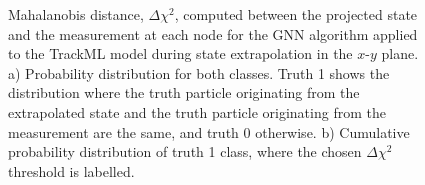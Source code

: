 \begin{figure}[htbp!] 
    \centering
    \hfill%
    \caption{Mahalanobis distance, $\Delta \chi^{2}$, computed between the projected state and the measurement at each node for the GNN algorithm applied to the TrackML model during state extrapolation in the $x$-$y$ plane. a) Probability distribution for both classes. Truth 1 shows the distribution where the truth particle originating from the extrapolated state and the truth particle originating from the measurement are the same, and truth 0 otherwise. b) Cumulative probability distribution of truth 1 class, where the chosen $\Delta \chi^{2}$ threshold is labelled.}
    \label{fig:mahalanobis-threshold-trackml-xy}
\end{figure}



